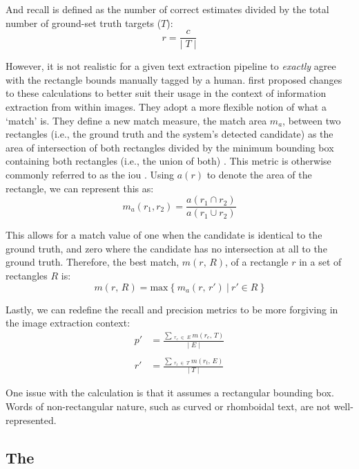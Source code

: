 And recall is defined as the number of correct estimates divided by the total number of ground-set truth targets ($T$):
\begin{equation*}
  r = \frac{c}{\lvert\;T\;\rvert}
\end{equation*}

However, it is not realistic for a given text extraction pipeline to \textit{exactly} agree with the rectangle bounds manually tagged by a human. \citet{Lucas:2003iw} first proposed changes to these calculations to better suit their usage in the context of information extraction from within images. They adopt a more flexible notion of what a `match' is. They define a new match measure, the match area $m_{a}$, between two rectangles (i.e., the ground truth and the system's detected candidate) as the area of intersection of both rectangles divided by the minimum bounding box containing both rectangles (i.e., the union of both) \citep{Lucas:2003iw, Lucas:2005bq, Lucas:2005hl}. This metric is otherwise commonly referred to as the \gls{iou} \citep{Karatzas:2015tj,Lin:2014vma,Jaderberg:2016wj}. Using $a(r)$ to denote the area of the rectangle, we can represent this as:
\begin{equation*}
  m_{a}(r_{1}, r_{2}) = \frac{a(r_{1} \cap r_{2})}{a(r_{1} \cup r_{2})}
\end{equation*}

This allows for a match value of one when the candidate is identical to the ground truth, and zero where the candidate has no intersection at all to the ground truth. Therefore, the best match, $m(r,\,R)$, of a rectangle $r$ in a set of rectangles $R$ is:
\begin{equation*}
  m(r,\,R) = \mathrm{max}~\{~m_{a}(r,\,r')~|~r' \in R~\}
\end{equation*}

Lastly, we can redefine the recall and precision metrics to be more forgiving in the image extraction context:
\begin{align*}
  p' &= \frac{\sum\,_{r_{e}\;\in\;E}~m(r_{e},\,T)}{\lvert\;E\;\rvert}\\\\
  r' &= \frac{\sum\,_{r_{t}\;\in\;T}~m(r_{t},\,E)}{\lvert\;T\;\rvert}
\end{align*}

One issue with the calculation is that it assumes a rectangular bounding box. Words of non-rectangular nature, such as curved or rhomboidal text, are not well-represented.

\subsection{The \fscore}
\label{sec:background:metrics:fscore}

